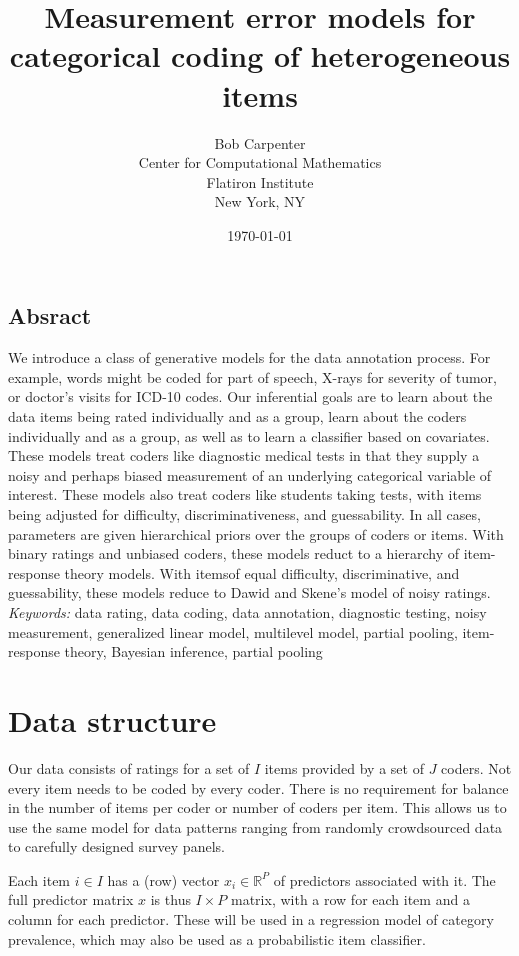 \documentclass[10pt]{article}
\title{Measurement error models for categorical coding
  of heterogeneous items}
\author{Bob Carpenter \\ Center for Computational Mathematics \\
  Flatiron Institute \\ New York, NY}
\date{\today}
\begin{document}
\maketitle

\subsection*{Absract}

We introduce a class of generative models for the data annotation
process. For example, words might be coded for part of speech, X-rays
for severity of tumor, or doctor's visits for ICD-10 codes. Our
inferential goals are to learn about the data items being rated
individually and as a group, learn about the coders individually and
as a group, as well as to learn a classifier based on covariates.
These models treat coders like diagnostic medical tests in that they
supply a noisy and perhaps biased measurement of an underlying
categorical variable of interest. These models also treat coders like
students taking tests, with items being adjusted for difficulty,
discriminativeness, and guessability. In all cases, parameters are
given hierarchical priors over the groups of coders or items. With
binary ratings and unbiased coders, these models reduct to a hierarchy
of item-response theory models. With itemsof equal difficulty,
discriminative, and guessability, these models reduce to Dawid and
Skene's model of noisy ratings.
\\[12pt]
{\textit{Keywords:} data rating, data coding, data annotation,
  diagnostic testing, noisy measurement, generalized linear model,
  multilevel model, partial pooling, item-response theory, Bayesian
  inference, partial pooling}


\section{Data structure}

Our data consists of ratings for a set of $I$ items provided by a set
of $J$ coders. Not every item needs to be coded by every coder. There
is no requirement for balance in the number of items per coder or
number of coders per item. This allows us to use the same model for
data patterns ranging from randomly crowdsourced data to carefully
designed survey panels.

Each item $i \in I$ has a (row) vector $x_i \in \mathbb{R}^P$ of
predictors associated with it. The full predictor matrix $x$ is thus
$I \times P$ matrix, with a row for each item and a column for each
predictor. These will be used in a regression model of category
prevalence, which may also be used as a probabilistic item classifier.
\end{document}

